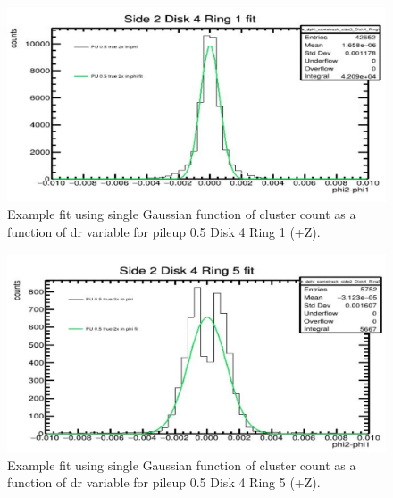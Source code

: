 \begin{figure}[!htp]
\centering
\includegraphics[width=1\textwidth]{ashish_thesis/D4R1S2_fit_PU0p5.png}
\caption{%
  Example fit using single Gaussian function of cluster count as a function of dr variable for pileup 0.5 Disk 4 Ring 1 (+Z).
}
\label{fig:cluster_ring}
\end{figure}


\begin{figure}[!htp]
\centering
\includegraphics[width=1\textwidth]{ashish_thesis/D4R5_fit_PU0p5.png}
\caption{%
 Example fit using single Gaussian function of cluster count as a function of dr variable for pileup 0.5 Disk 4 Ring 5 (+Z). 
}
\label{fig:cluster_ring}
\end{figure}

